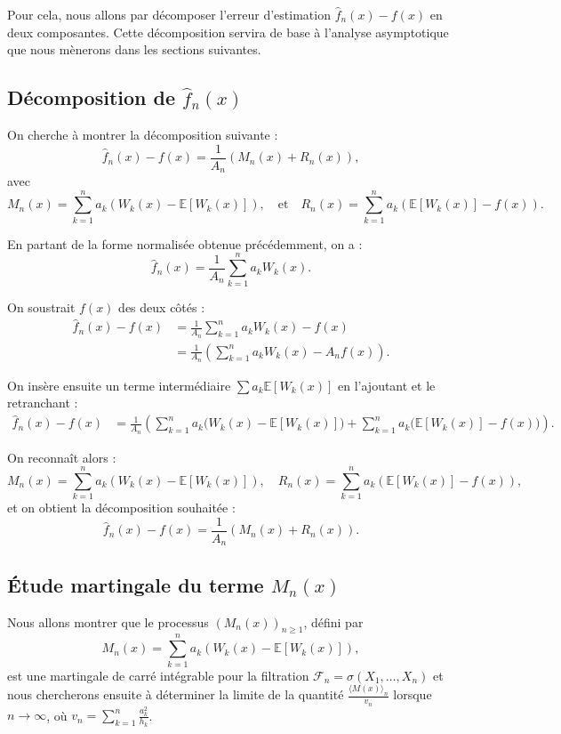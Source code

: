 \documentclass[12pt]{article}
\begin{document}
Pour cela, nous allons par décomposer l'erreur d'estimation \( \hat{f}_n(x) - f(x) \) en deux composantes. Cette décomposition servira de base à l'analyse asymptotique que nous mènerons dans les sections suivantes.

\subsection{Décomposition de \( \hat{f}_n(x) \)}

On cherche à montrer la décomposition suivante :
\[
\hat{f}_n(x) - f(x) = \frac{1}{A_n} \left( M_n(x) + R_n(x) \right),
\]
avec
\[
M_n(x) = \sum_{k=1}^n a_k \left(W_k(x) - \mathbb{E}[W_k(x)]\right),  
\quad \text{et} \quad  
R_n(x) = \sum_{k=1}^n a_k \left(\mathbb{E}[W_k(x)] - f(x)\right).
\]

\medskip
\noindent

En partant de la forme normalisée obtenue précédemment, on a :
\[
\hat{f}_n(x) = \frac{1}{A_n} \sum_{k=1}^n a_k W_k(x).
\]

On soustrait \( f(x) \) des deux côtés :
\begin{align}
\hat{f}_n(x) - f(x) 
&= \frac{1}{A_n} \sum_{k=1}^n a_k W_k(x) - f(x) \\
&= \frac{1}{A_n} \left( \sum_{k=1}^n a_k W_k(x) - A_n f(x) \right).
\end{align}

On insère ensuite un terme intermédiaire \( \sum a_k \mathbb{E}[W_k(x)] \) en l’ajoutant et le retranchant :
\begin{align}
\hat{f}_n(x) - f(x)
&= \frac{1}{A_n} \left( \sum_{k=1}^n a_k \big(W_k(x) - \mathbb{E}[W_k(x)]\big)
+ \sum_{k=1}^n a_k \big(\mathbb{E}[W_k(x)] - f(x)\big) \right).
\end{align}

On reconnaît alors :
\[
M_n(x) = \sum_{k=1}^n a_k \left(W_k(x) - \mathbb{E}[W_k(x)]\right),
\quad R_n(x) = \sum_{k=1}^n a_k \left(\mathbb{E}[W_k(x)] - f(x)\right),
\]
et on obtient la décomposition souhaitée :
\[
\hat{f}_n(x) - f(x) = \frac{1}{A_n} \left( M_n(x) + R_n(x) \right).
\]


\subsection{Étude martingale du terme \( M_n(x) \)}

Nous allons montrer que le processus \( (M_n(x))_{n \geq 1} \), défini par
\[
M_n(x) = \sum_{k=1}^n a_k \left( W_k(x) - \mathbb{E}[W_k(x)] \right),
\]
est une martingale de carré intégrable pour la filtration  \( \mathcal{F}_n = \sigma(X_1, \dots, X_n) \) et nous chercherons ensuite à déterminer la limite de la quantité \( \frac{\langle M(x) \rangle_n}{v_n} \) lorsque \( n \to \infty \), où \( v_n = \sum_{k=1}^n \frac{a_k^2}{h_k} \).
\end{document}
